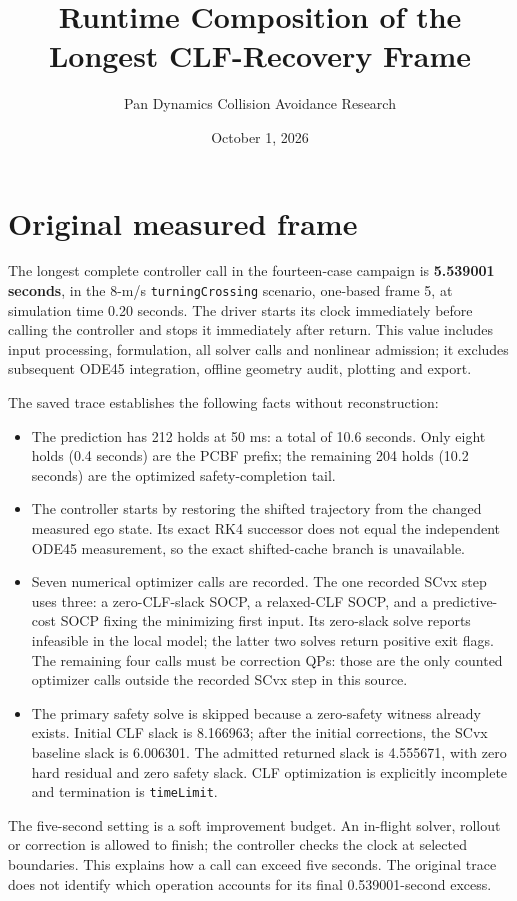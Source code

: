 \documentclass[11pt]{article}
\title{Runtime Composition of the Longest CLF-Recovery Frame}
\author{Pan Dynamics Collision Avoidance Research}
\date{October 1, 2026}
\begin{document}
\maketitle

\section{Original measured frame}
The longest complete controller call in the fourteen-case campaign is
\textbf{5.539001 seconds}, in the 8-m/s \texttt{turningCrossing} scenario,
one-based frame 5, at simulation time 0.20 seconds. The driver starts its
clock immediately before calling the controller and stops it immediately
after return. This value includes input processing, formulation, all solver
calls and nonlinear admission; it excludes subsequent ODE45 integration,
offline geometry audit, plotting and export.

The saved trace establishes the following facts without reconstruction:
\begin{itemize}
\item The prediction has 212 holds at 50 ms: a total of 10.6 seconds.
Only eight holds (0.4 seconds) are the PCBF prefix; the remaining 204 holds
(10.2 seconds) are the optimized safety-completion tail.
\item The controller starts by restoring the shifted trajectory from the
changed measured ego state. Its exact RK4 successor does not equal the
independent ODE45 measurement, so the exact shifted-cache branch is unavailable.
\item Seven numerical optimizer calls are recorded. The one recorded SCvx
step uses three: a zero-CLF-slack SOCP, a relaxed-CLF SOCP, and a predictive-cost
SOCP fixing the minimizing first input. Its zero-slack solve reports infeasible
in the local model; the latter two solves return positive exit flags. The
remaining four calls must be correction QPs: those are the only counted
optimizer calls outside the recorded SCvx step in this source.
\item The primary safety solve is skipped because a zero-safety witness
already exists. Initial CLF slack is 8.166963; after the initial corrections,
the SCvx baseline slack is 6.006301. The admitted returned slack is 4.555671,
with zero hard residual and zero safety slack. CLF optimization is explicitly
incomplete and termination is \texttt{timeLimit}.
\end{itemize}
The five-second setting is a soft improvement budget. An in-flight solver,
rollout or correction is allowed to finish; the controller checks the clock
at selected boundaries. This explains how a call can exceed five seconds.
The original trace does not identify which operation accounts for its final
0.539001-second excess.
\end{document}
